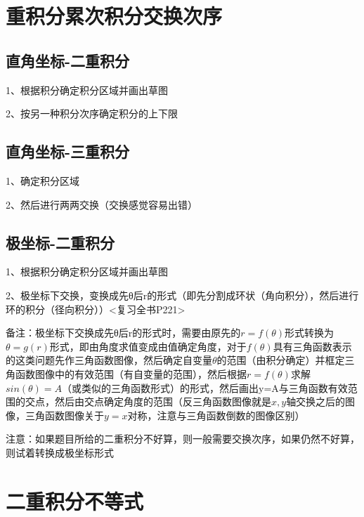 \section{重积分累次积分交换次序}



\subsection{直角坐标-二重积分}

1、根据积分确定积分区域并画出草图

2、按另一种积分次序确定积分的上下限



\subsection{直角坐标-三重积分}

1、确定积分区域

2、然后进行两两交换（交换感觉容易出错）



\subsection{极坐标-二重积分}

1、根据积分确定积分区域并画出草图

2、极坐标下交换，变换成先θ后r的形式（即先分割成环状（角向积分），然后进行环的积分（径向积分））<复习全书P221>

备注：极坐标下交换成先θ后r的形式时，需要由原先的$r=f(\theta)$形式转换为$\theta=g(r)$形式，即由角度求值变成由值确定角度，对于$f(\theta)$具有三角函数表示的这类问题先作三角函数图像，然后确定自变量$\theta$的范围（由积分确定）并框定三角函数图像中的有效范围（有自变量的范围），然后根据$r=f(\theta)$求解$sin(\theta)=A$（或类似的三角函数形式）的形式，然后画出y=A与三角函数有效范围的交点，然后由交点确定角度的范围（反三角函数图像就是$x,y$轴交换之后的图像，三角函数图像关于$y=x$对称，注意与三角函数倒数的图像区别）

注意：如果题目所给的二重积分不好算，则一般需要交换次序，如果仍然不好算，则试着转换成极坐标形式

\section{二重积分不等式}



